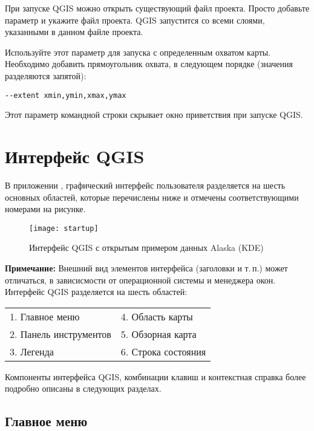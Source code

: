 При запуске QGIS можно открыть существующий файл проекта. Просто
добавьте параметр  и укажите файл проекта. QGIS
запустится со всеми слоями, указанными в данном файле проекта.

Используйте этот параметр для запуска с определенным охватом карты.
Необходимо добавить прямоугольник охвата, в следующем порядке (значения
разделяются запятой):
\begin{verbatim}
--extent xmin,ymin,xmax,ymax
\end{verbatim}

Этот параметр командной строки скрывает окно приветствия при запуске QGIS.

\section{Интерфейс QGIS}
\label{label_qgismainwindow}

В приложении \qg, графический интерфейс пользователя разделяется на шесть основных
областей, которые перечислены ниже и отмечены соответствующими номерами на рисунке.

\begin{figure}[ht]
   \centering
    \texttt{[image: startup]}
    \caption{Интерфейс QGIS с открытым примером данных Alaska \nixcaption (KDE)} \label{fig:startup}
\end{figure}

\textbf{Примечание:} Внешний вид элементов интерфейса (заголовки
и т.\,п.) может отличаться, в зависисмости от операционной системы и
менеджера окон.\\

Интерфейс QGIS разделяется на шесть областей:

\begin{tabular}{p{5cm} p{5cm}}
1. Главное меню & 4. Область карты \\
2. Панель инструментов & 5. Обзорная карта \\
3. Легенда & 6. Строка состояния \\
\end{tabular}

Компоненты интерфейса QGIS, комбинации клавиш и контекстная справка более
подробно описаны в следующих разделах.

\subsection{Главное меню}\label{label_menubar}

